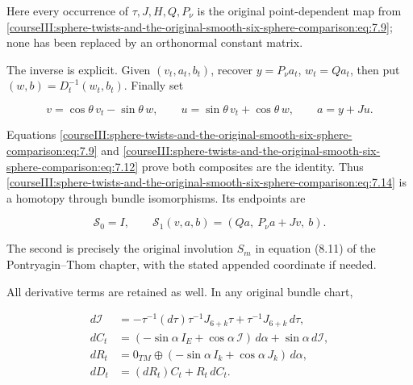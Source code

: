 Here every occurrence of \(\tau,J,H,Q,P_\nu\) is the original point-dependent map from \eqref{courseIII:sphere-twists-and-the-original-smooth-six-sphere-comparison:eq:7.9}; none has been replaced by an orthonormal constant matrix.

The inverse is explicit. Given \((v_t,a_t,b_t)\), recover \(y=P_\nu a_t\), \(w_t=Qa_t\), then put \((w,b)=D_t^{-1}(w_t,b_t)\). Finally set

\begin{equation}
v=\cos\theta\,v_t-\sin\theta\,w,\qquad
 u=\sin\theta\,v_t+\cos\theta\,w,\qquad a=y+Ju .
 \label{courseIII:sphere-twists-and-the-original-smooth-six-sphere-comparison:eq:7.15}
\end{equation}

Equations \eqref{courseIII:sphere-twists-and-the-original-smooth-six-sphere-comparison:eq:7.9} and \eqref{courseIII:sphere-twists-and-the-original-smooth-six-sphere-comparison:eq:7.12} prove both composites are the identity. Thus \eqref{courseIII:sphere-twists-and-the-original-smooth-six-sphere-comparison:eq:7.14} is a homotopy through bundle isomorphisms. Its endpoints are

\begin{equation}
\mathcal S_0=I,\qquad
 \mathcal S_1(v,a,b)=(Qa,\ P_\nu a+Jv,\ b).
 \label{courseIII:sphere-twists-and-the-original-smooth-six-sphere-comparison:eq:7.16}
\end{equation}

The second is precisely the original involution \(S_m\) in equation (8.11) of the Pontryagin--Thom chapter, with the stated appended coordinate if needed.

All derivative terms are retained as well. In any original bundle chart,

\begin{equation}
\begin{split}
 d\mathcal I
   &=-\tau^{-1}(d\tau)\tau^{-1}J_{6+k}\tau
                           +\tau^{-1}J_{6+k}\,d\tau,\\
 dC_t
   &=(-\sin\alpha\,I_E+\cos\alpha\,\mathcal I)\,d\alpha
                                      +\sin\alpha\,d\mathcal I,\\
 dR_t
   &=0_{TM}\oplus(-\sin\alpha\,I_k+\cos\alpha\,J_k)\,d\alpha,\\
 dD_t&=(dR_t)C_t+R_t\,dC_t .
 \end{split}
 \label{courseIII:sphere-twists-and-the-original-smooth-six-sphere-comparison:eq:7.17}
\end{equation}


